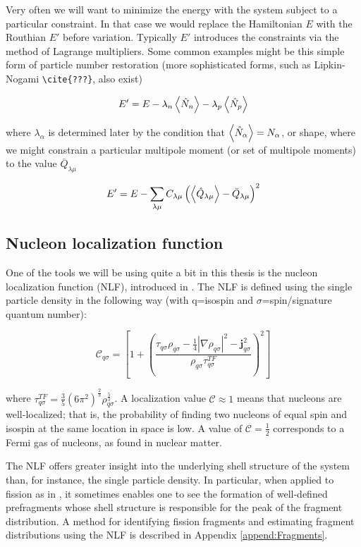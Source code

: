 Very often we will want to minimize the energy with the system subject to a particular constraint. In that case we would replace the Hamiltonian $E$ with the Routhian $E'$ before variation. Typically $E'$ introduces the constraints via the method of Lagrange multipliers. Some common examples might be this simple form of particle number restoration (more sophisticated forms, such as Lipkin-Nogami \verb|\cite{???}|, also exist)

\begin{equation}
E' = E - \lambda_n \expval{\hat{N}_n} - \lambda_p \expval{\hat{N}_p}
\end{equation}

\noindent where $\lambda_\alpha$ is determined later by the condition that $\expval{\hat{N}_\alpha} = N_\alpha$, or shape, where we might constrain a particular multipole moment (or set of multipole moments) to the value $\bar{Q}_{\lambda\mu}$

\begin{equation}
E' = E - \sum_{\lambda\mu} C_{\lambda\mu} \left(\expval{\hat{Q}_{\lambda\mu}} - \bar{Q}_{\lambda\mu}\right)^2
\end{equation}


\subsection{Nucleon localization function}\label{sect:locali}
One of the tools we will be using quite a bit in this thesis is the nucleon localization function (NLF), introduced in \cite{Zhang2016}. The NLF is defined using the single particle density in the following way (with q=isospin and $\sigma$=spin/signature quantum number):

\begin{equation}
\mathcal{C}_{q\sigma} = \left[1+\left(\frac{\tau_{q\sigma}\rho_{q\sigma}-\frac{1}{4}|\nabla\rho_{q\sigma}|^2-\mathbf{j}^2_{q\sigma}}{\rho_{q\sigma}\tau_{q\sigma}^{TF}}\right)^2\right]
\end{equation}

\noindent where $\tau_{q\sigma}^{TF}=\frac{3}{5}(6\pi^2)^\frac{2}{3}\rho_{q\sigma}^\frac{5}{3}$. A localization value $\mathcal{C} \approx 1$ means that nucleons are well-localized; that is, the probability of finding two nucleons of equal spin and isospin at the same location in space is low. A value of $\mathcal{C}=\frac{1}{2}$ corresponds to a Fermi gas of nucleons, as found in nuclear matter.

The NLF offers greater insight into the underlying shell structure of the system than, for instance, the single particle density. In particular, when applied to fission as in \cite{Sadhukhan2017}, it sometimes enables one to see the formation of well-defined prefragments whose shell structure is responsible for the peak of the fragment distribution. A method for identifying fission fragments and estimating fragment distributions using the NLF is described in Appendix \ref{append:Fragments}.

